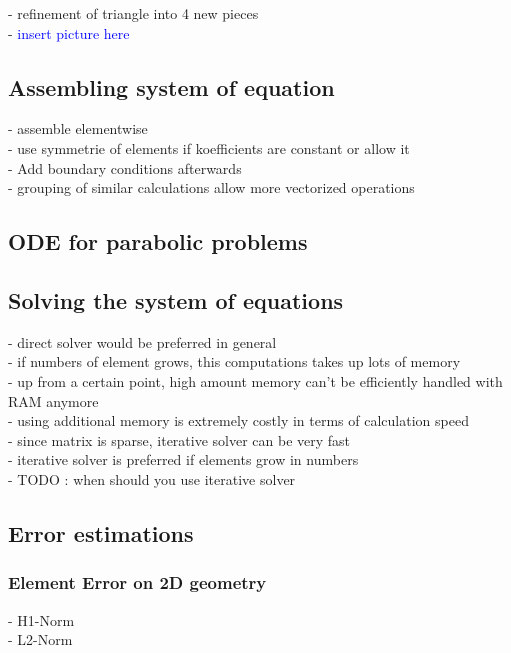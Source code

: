 \documentclass[parskip=half, titlepage=yes, 12pt, BCOR=12mm, DIV=calc]{scrartcl}
\begin{document}
- refinement of triangle into 4 new pieces \\
- \textcolor{blue}{insert picture here}

\subsection{Assembling system of equation}

- assemble elementwise \\
- use symmetrie of elements if koefficients are constant or allow it \\
- Add boundary conditions afterwards \\
- grouping of similar calculations allow more vectorized operations \\ 

\subsection{ODE for parabolic problems}


\subsection{Solving the system of equations}
- direct solver would be preferred in general \\
- if numbers of element grows, this computations takes up lots of memory \\
- up from a certain point, high amount memory can't be efficiently handled with RAM anymore \\
- using additional memory is extremely costly in terms of calculation speed \\
- since matrix is sparse, iterative solver can be very fast \\
- iterative solver is preferred if elements grow in numbers \\
- TODO : when should you use iterative solver \\

\subsection{Error estimations}

\subsubsection{Element Error on 2D geometry}
- H1-Norm \\
- L2-Norm \\
\end{document}

